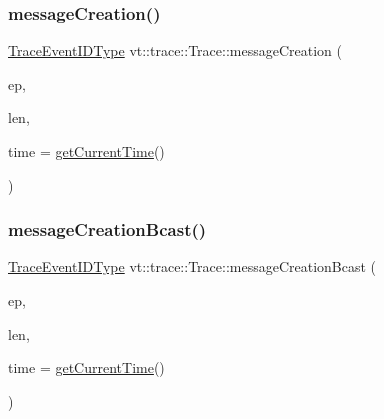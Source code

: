\mbox{\label{structvt_1_1trace_1_1_trace_a5b5091197568d7ed104bb40d68b4ddd7}} 
\subsubsection{\texorpdfstring{message\+Creation()}{messageCreation()}}
{\footnotesize\ttfamily \hyperlink{namespacevt_1_1trace_a64a7185f3e102df8d8258f263ccd1582}{Trace\+Event\+I\+D\+Type} vt\+::trace\+::\+Trace\+::message\+Creation (\begin{DoxyParamCaption}\item[{\hyperlink{namespacevt_1_1trace_a3c14050715ba9eceaeff51fb3de64f2f}{Trace\+Entry\+I\+D\+Type} const}]{ep,  }\item[{\hyperlink{namespacevt_1_1trace_aeb598f45d67d41db7902e494f2f0ce59}{Trace\+Msg\+Len\+Type} const}]{len,  }\item[{double const}]{time = {\ttfamily \hyperlink{structvt_1_1trace_1_1_trace_a04cf6b76b4ced1bc90d246a34c948db5}{get\+Current\+Time}()} }\end{DoxyParamCaption})}

\mbox{\label{structvt_1_1trace_1_1_trace_ad034b14649101fb530eccfb4e2b958ce}} 
\subsubsection{\texorpdfstring{message\+Creation\+Bcast()}{messageCreationBcast()}}
{\footnotesize\ttfamily \hyperlink{namespacevt_1_1trace_a64a7185f3e102df8d8258f263ccd1582}{Trace\+Event\+I\+D\+Type} vt\+::trace\+::\+Trace\+::message\+Creation\+Bcast (\begin{DoxyParamCaption}\item[{\hyperlink{namespacevt_1_1trace_a3c14050715ba9eceaeff51fb3de64f2f}{Trace\+Entry\+I\+D\+Type} const}]{ep,  }\item[{\hyperlink{namespacevt_1_1trace_aeb598f45d67d41db7902e494f2f0ce59}{Trace\+Msg\+Len\+Type} const}]{len,  }\item[{double const}]{time = {\ttfamily \hyperlink{structvt_1_1trace_1_1_trace_a04cf6b76b4ced1bc90d246a34c948db5}{get\+Current\+Time}()} }\end{DoxyParamCaption})}

